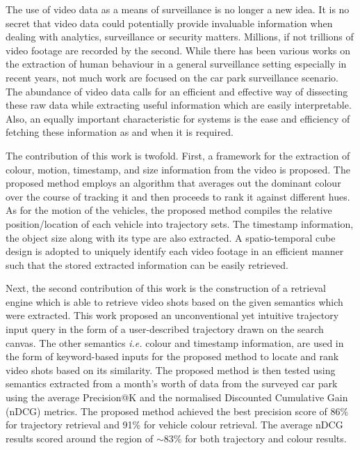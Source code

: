 
The use of video data as a means of surveillance is no longer a new idea. It is no secret that video data could potentially provide invaluable information when dealing with analytics, surveillance or security matters. Millions, if not trillions of video footage are recorded by the second. While there has been various works on the extraction of human behaviour in a general surveillance setting especially in recent years, not much work are focused on the car park surveillance scenario. The abundance of video data calls for an efficient and effective way of dissecting these raw data while extracting useful information which are easily interpretable. Also, an equally important characteristic for systems is the ease and efficiency of fetching these information as and when it is required. 

The contribution of this work is twofold. First, a framework for the extraction of colour, motion, timestamp, and size information from the video is proposed. 
The proposed method employs an algorithm that averages out the dominant colour over the course of tracking it and then proceeds to rank it against different hues. 
As for the motion of the vehicles, the proposed method compiles the relative position/location of each vehicle into trajectory sets. The timestamp information, the object size along with its type are also extracted. A spatio-temporal cube design is adopted to uniquely identify each video footage in an efficient manner such that the stored extracted information can be easily retrieved. %

Next, the second contribution of this work is the construction of a retrieval engine which is able to retrieve video shots based on the given semantics which were extracted. This work proposed an unconventional yet intuitive trajectory input query in the form of a user-described trajectory drawn on the search canvas. 
The other semantics \emph{i.e.} colour and timestamp information, are used in the form of keyword-based inputs for the proposed method to locate and rank video shots based on its similarity. 
The proposed method is then tested using semantics extracted from a month's worth of data from the surveyed car park 
using the average Precision@K and the normalised Discounted Cumulative Gain (nDCG) metrics. The proposed method achieved the best precision score of 86\% for trajectory retrieval and 91\% for vehicle colour retrieval. %
The average nDCG results scored around the region of $\sim$83\% for both trajectory and colour results. 

